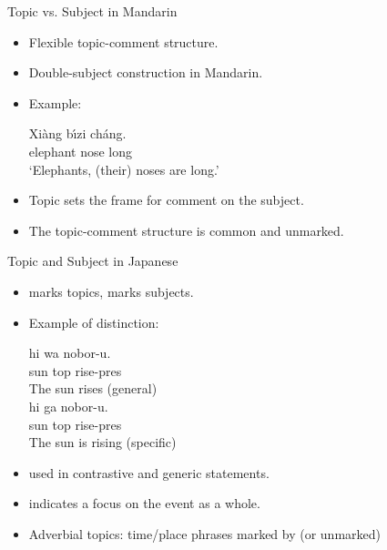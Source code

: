 \documentclass{beamer}
\begin{document}
\begin{frame}{Topic vs. Subject in Mandarin}
  \begin{itemize}
    \item Flexible topic-comment structure.
    \item Double-subject construction in Mandarin.
    \item Example:
    \begin{exe}
\ex 
    \gll Xiàng bı́zi cháng. \\
         elephant nose long \\
    \trans ‘Elephants, (their) noses are long.’
    \end{exe}
    \item Topic sets the frame for comment on the subject.
    \item The topic-comment structure is common and unmarked.
  \end{itemize}
\end{frame}

\begin{frame}{Topic and Subject in Japanese}
  \begin{itemize}
    \item {} marks topics,  marks subjects.
    \item Example of  distinction:
      \begin{exe}
      \ex

    \gll hi wa nobor-u. \\
          sun top rise-pres \\
    \trans The sun rises (general) \\
     \ex
    \gll hi ga nobor-u. \\
             sun top rise-pres \\
     \trans The sun is rising (specific) \\
         \end{exe}

    
    \item {} used in contrastive and generic statements.
    \item {} indicates a focus on the event as a whole.
    \item Adverbial topics: time/place phrases marked by  (or unmarked)
  \end{itemize}
\end{frame}
\end{document}
